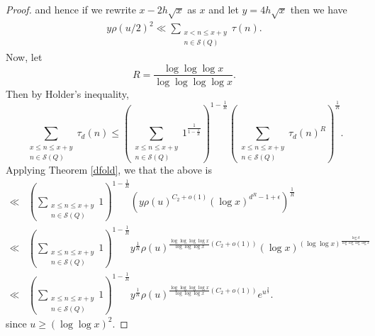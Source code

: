\documentclass{amsart}
\begin{document}
\begin{proof}
and hence if we rewrite $x-2h\sqrt x$ as $x$ and let $y=4h\sqrt x$ then we have
\begin{gather}\label{zrho2}y\rho(u/2)^2\ll \sum_{\substack{x<n\leq x+y \\ n\in \mathcal S(Q)}}\tau(n).\end{gather}
Now, let 
$$R=\frac{\log\log \log x}{\log \log \log \log x}.$$
Then by Holder's inequality,
$$\sum_{\substack{x\leq n\leq x+y \\ n\in \mathcal S(Q) }}\tau_d(n)\leq \left(\sum_{\substack{x\leq n\leq x+y \\ n\in \mathcal S(Q) }}1^{\frac{1}{1-\frac 1R}}\right)^{1-\frac 1R}\left(\sum_{\substack{x\leq n\leq x+y \\ n\in \mathcal S(Q) }}\tau_d(n)^{R}\right)^\frac 1R.$$
Applying Theorem \ref{dfold}, we that the above is
\begin{align*}\ll &\left(\sum_{\substack{x\leq n\leq x+y \\ n\in \mathcal S(Q) }}1\right)^{1-\frac 1R}\left(y \rho(u)^{C_2+o(1)}\left(\log x\right)^{d^{R}-1+\epsilon}\right)^\frac 1R\\
\ll &\left(\sum_{\substack{x\leq n\leq x+y \\ n\in \mathcal S(Q) }}1\right)^{1-\frac 1R}y^\frac 1R \rho(u)^{\frac{\log\log\log\log x}{\log\log\log x}\left(C_2+o(1)\right)}\left(\log x\right)^{\left(\log\log x\right)^{\frac{\log d}{\log\log\log\log x}}}\\
\ll & \left(\sum_{\substack{x\leq n\leq x+y \\ n\in \mathcal S(Q) }}1\right)^{1-\frac 1R}y^\frac 1R \rho(u)^{\frac{\log\log\log\log x}{\log\log\log x}\left(C_2+o(1)\right)}e^{u^\frac 23}.
\end{align*}
since $u\geq (\log\log x)^2$. 


\end{proof}
\end{document}
